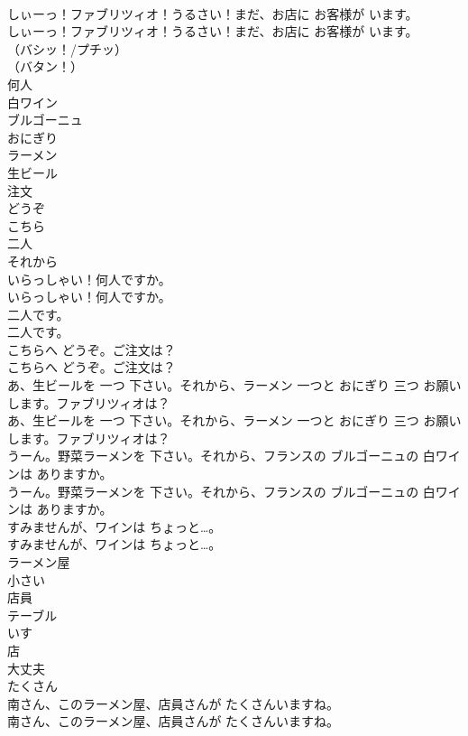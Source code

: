 \documentclass[8pt]{extreport}
\begin{document}
\begin{CJK}{UTF8}{min}
\\	しぃーっ！ファブリツィオ！うるさい！まだ、お店に お客様が います。	
\\	しぃーっ！ファブリツィオ！うるさい！まだ、お店に お客様が います。 
\\	（バシッ！/プチッ）	
\\	（バタン！）	
\\	何人
\\	白ワイン
\\	ブルゴーニュ
\\	おにぎり
\\	ラーメン
\\	生ビール
\\	注文
\\	どうぞ
\\	こちら
\\	二人
\\	それから
\\	いらっしゃい！何人ですか。	
\\	いらっしゃい！何人ですか。 
\\	二人です。	
\\	二人です。 
\\	こちらへ どうぞ。ご注文は？	
\\	こちらへ どうぞ。ご注文は？ 
\\	あ、生ビールを 一つ 下さい。それから、ラーメン 一つと おにぎり 三つ お願いします。ファブリツィオは？	
\\	あ、生ビールを 一つ 下さい。それから、ラーメン 一つと おにぎり 三つ お願いします。ファブリツィオは？ 
\\	うーん。野菜ラーメンを 下さい。それから、フランスの ブルゴーニュの 白ワインは ありますか。	
\\	うーん。野菜ラーメンを 下さい。それから、フランスの ブルゴーニュの 白ワインは ありますか。 
\\	すみませんが、ワインは ちょっと…。	
\\	すみませんが、ワインは ちょっと…。 
\\	ラーメン屋
\\	小さい
\\	店員
\\	テーブル
\\	いす
\\	店
\\	大丈夫
\\	たくさん
\\	南さん、このラーメン屋、店員さんが たくさんいますね。	
\\	南さん、このラーメン屋、店員さんが たくさんいますね。 

\end{CJK}
\end{document}
